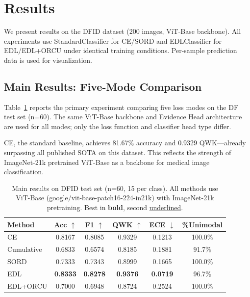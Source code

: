 \section{Results}

We present results on the DFID dataset (200 images, ViT-Base backbone). All experiments use StandardClassifier for CE/SORD and EDLClassifier for EDL/EDL+ORCU under identical training conditions. Per-sample prediction data is used for visualization.

\subsection{Main Results: Five-Mode Comparison}

Table~\ref{tab:df_main} reports the primary experiment comparing five loss modes on the DF test set (n=60). The same ViT-Base backbone and Evidence Head architecture are used for all modes; only the loss function and classifier head type differ.

CE, the standard baseline, achieves 81.67\% accuracy and 0.9329 QWK---already surpassing all published SOTA on this dataset. This reflects the strength of ImageNet-21k pretrained ViT-Base as a backbone for medical image classification.

\begin{table}[htbp]
\centering
\caption{Main results on DFID test set (n=60, 15 per class). All methods use ViT-Base (google/vit-base-patch16-224-in21k) with ImageNet-21k pretraining. Best in \textbf{bold}, second \underline{underlined}.}
\label{tab:df_main}
\begin{tabular}{lccccc}
\toprule
\textbf{Method} & \textbf{Acc $\uparrow$} & \textbf{F1 $\uparrow$} & \textbf{QWK $\uparrow$} & \textbf{ECE $\downarrow$} & \textbf{\%Unimodal} \\
\midrule
CE & 0.8167 & 0.8085 & 0.9329 & 0.1213 & 100.0\% \\
Cumulative & 0.6833 & 0.6574 & 0.8185 & 0.1881 & 91.7\% \\
SORD & 0.7333 & 0.7343 & 0.8999 & 0.1665 & 100.0\% \\
EDL & \textbf{0.8333} & \textbf{0.8278} & \textbf{0.9376} & \textbf{0.0719} & 96.7\% \\
EDL+ORCU & 0.7000 & 0.6948 & 0.8724 & 0.2524 & 100.0\% \\
\bottomrule
\end{tabular}
\end{table}

